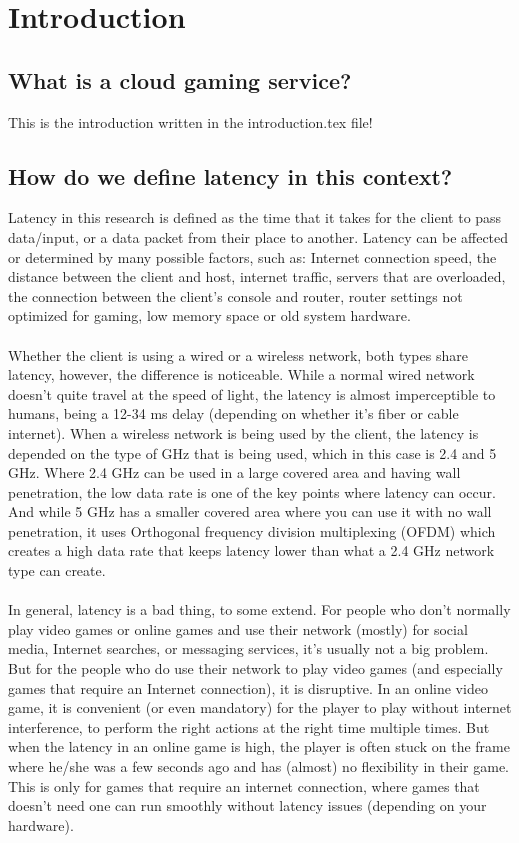 \section{Introduction}

\subsection{What is a cloud gaming service?}
This is the introduction written in the introduction.tex file!

\subsection{How do we define latency in this context?}
Latency in this research is defined as the time that it takes for the client to pass data/input, or a data packet from their place to another. Latency can be affected or determined by many possible factors, such as: Internet connection speed, the distance between the client and host, internet traffic, servers that are overloaded, the connection between the client's console and router, router settings not optimized for gaming, low memory space or old system hardware.\\\\
Whether the client is using a wired or a wireless network, both types share latency, however, the difference is noticeable. While a normal wired network doesn't quite travel at the speed of light, the latency is almost imperceptible to humans, being a 12-34 ms delay (depending on whether it's fiber or cable internet). When a wireless network is being used by the client, the latency is depended on the type of GHz that is being used, which in this case is 2.4 and 5 GHz. Where 2.4 GHz can be used in a large covered area and having wall penetration, the low data rate is one of the key points where latency can occur. And while 5 GHz has a smaller covered area where you can use it with no wall penetration, it uses Orthogonal frequency division multiplexing (OFDM) which creates a high data rate that keeps latency lower than what a 2.4 GHz network type can create.\\\\
In general, latency is a bad thing, to some extend. For people who don't normally play video games or online games and use their network (mostly) for social media, Internet searches, or messaging services, it's usually not a big problem. But for the people who do use their network to play video games (and especially games that require an Internet connection), it is disruptive. In an online video game, it is convenient (or even mandatory) for the player to play without internet interference, to perform the right actions at the right time multiple times. But when the latency in an online game is high, the player is often stuck on the frame where he/she was a few seconds ago and has (almost) no flexibility in their game. This is only for games that require an internet connection, where games that doesn't need one can run smoothly without latency issues (depending on your hardware).\\\\
